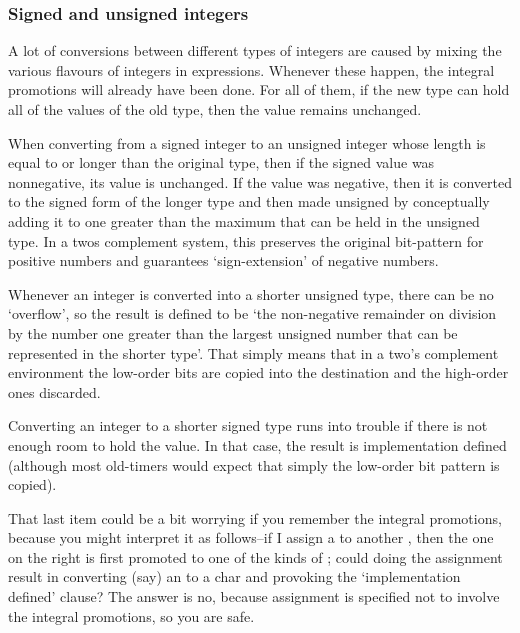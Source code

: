    

   \subsubsection{Signed and unsigned integers}
    

    A lot of conversions between different types of integers are caused by
     mixing the various flavours of integers in expressions. Whenever these
     happen, the integral promotions will already have been done. For all of
     them, if the new type can hold all of the values of the old type, then
     the value remains unchanged.


    When converting from a signed integer to an unsigned integer whose
     length is equal to or longer than the original type, then if the signed
     value was nonnegative, its value is unchanged. If the value was negative,
     then it is converted to the signed form of the longer type and then made
     unsigned by conceptually adding it to one greater than the maximum that
     can be held in the unsigned type. In a twos complement system, this
     preserves the original bit-pattern for positive numbers and guarantees
     `sign-extension' of negative numbers.


    Whenever an integer is converted into a shorter unsigned type, there
     can be no `overflow', so the result is defined to be `the
     non-negative remainder on division by the number one greater than the
     largest unsigned number that can be represented in the shorter type'.
     That simply means that in a two's complement environment the low-order
     bits are copied into the destination and the high-order ones
     discarded.


    Converting an integer to a shorter signed type runs into trouble if
     there is not enough room to hold the value. In that case, the result is
     implementation defined (although most old-timers would expect that simply
     the low-order bit pattern is copied).


    That last item could be a bit worrying if you remember the integral
     promotions, because you might interpret it as follows--if I assign
     a \kchar{} to another \kchar, then the one on the
     right is first promoted to one of the kinds of \kint{}; could
     doing the assignment result in converting (say) an \kint{} to a
     char and provoking the `implementation defined' clause? The answer
     is no, because assignment is specified not to involve the integral
     promotions, so you are safe.


